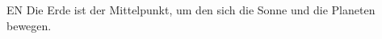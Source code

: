 \documentclass{article}
\begin{document}
\thispagestyle{empty}
\sffamily
\LARGE
\pagecolor{black}
\color{white}
\noindent
EN Die Erde ist der Mittelpunkt, um den sich
die Sonne und die Planeten bewegen\color{bunt}. 
\end{document}
